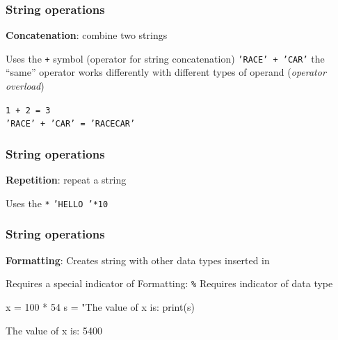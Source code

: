 \documentclass[11pt]{beamer}
\begin{document}
\begin{frame}
  \frametitle{String operations}
  \Enlarge

  \begin{itemize}
  \myitem  \textbf{Concatenation}:  combine two strings
    \begin{itemize}
    \mysubitem  Uses the \texttt{+} symbol (operator for string concatenation) \pause
    \mysubitem  \texttt{'RACE' + 'CAR'}\pause
    \mysubitem the ``same'' operator works differently with different types of operand (\emph{operator overload})
    \end{itemize}
  \end{itemize} \pause
   \vspace{-1mm}
   \hspace{15mm}\texttt{\textcolor{CS101GradBot}{1 + 2 = 3}} \\ \vspace{1mm}
   \hspace{15mm}\texttt{\textcolor{CS101GradBot}{'RACE' + 'CAR' = 'RACECAR'}} 
\end{frame}


\begin{frame}
  \frametitle{String operations}
  \Enlarge

  \begin{itemize}
  \myitem  \textbf{Repetition}:  repeat a string
    \begin{itemize}
    \mysubitem  Uses the \texttt{*}
    \mysubitem  \texttt{'HELLO '*10}
    \end{itemize}
  \end{itemize}
\end{frame}


\begin{frame}[fragile]
  \frametitle{String operations}
  \Enlarge

  \begin{itemize}
  \myitem  \textbf{Formatting}: Creates string with other data types inserted in \pause
    \begin{itemize}
    \mysubitem  Requires a special indicator of Formatting: \texttt{\%} \pause
    \mysubitem  Requires indicator of data type
    \end{itemize} \pause
  \begin{semiverbatim}
x = 100 * 54
s = "The value of x is: %
print(s)\pause

\textcolor{CS101GradBot}{The value of x is: 5400}
  \end{semiverbatim}
  \end{itemize}
\end{frame}
\end{document}
